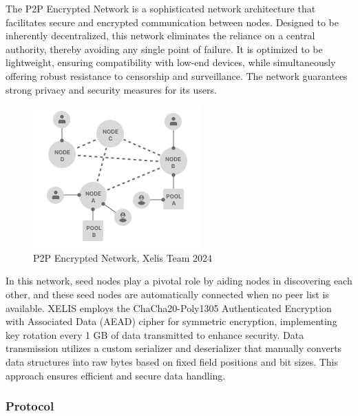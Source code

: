 \documentclass[12pt,a4paper,twocolumn]{article}
\begin{document}
The P2P Encrypted Network is a sophisticated network architecture that facilitates secure and encrypted communication between nodes. Designed to be inherently decentralized, this network eliminates the reliance on a central authority, thereby avoiding any single point of failure. It is optimized to be lightweight, ensuring compatibility with low-end devices, while simultaneously offering robust resistance to censorship and surveillance. The network guarantees strong privacy and security measures for its users.\\

\begin{figure}
    \centering
    \includegraphics[width=0.8\linewidth]{P2P.png}
    \caption{P2P Encrypted Network, Xelis Team 2024}
    \label{fig:enter-label}
\end{figure}

In this network, seed nodes play a pivotal role by aiding nodes in discovering each other, and these seed nodes are automatically connected when no peer list is available. XELIS employs the ChaCha20-Poly1305 Authenticated Encryption with Associated Data (AEAD) cipher for symmetric encryption, implementing key rotation every 1 GB of data transmitted to enhance security. Data transmission utilizes a custom serializer and deserializer that manually converts data structures into raw bytes based on fixed field positions and bit sizes. This approach ensures efficient and secure data handling.

\subsubsection{Protocol}
\end{document}
